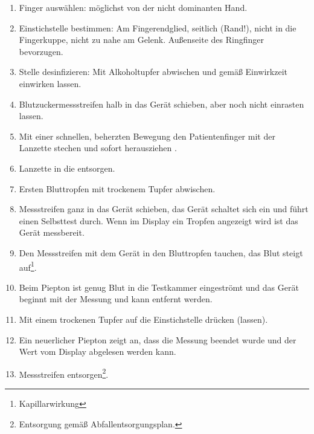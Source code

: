{
\begin{enumerate}
  \item Finger auswählen: möglichst von der nicht dominanten
  Hand.
  \item Einstichstelle bestimmen: Am Fingerendglied,
  seitlich (Rand!), nicht in die Fingerkuppe, nicht zu nahe
  am Gelenk. Außenseite des Ringfinger bevorzugen.
  \item Stelle desinfizieren: Mit Alkoholtupfer abwischen
  und gemäß Einwirkzeit einwirken lassen.
  \item Blutzuckermessstreifen halb in das Gerät schieben,
  aber noch nicht einrasten lassen.
  \item Mit einer schnellen, beherzten Bewegung den
  Patientenfinger mit der Lanzette stechen und sofort
  herausziehen .
  \item Lanzette in die  entsorgen.
  \item Ersten Bluttropfen mit trockenem Tupfer abwischen.
  \item Messstreifen ganz in das Gerät schieben, das Gerät
  schaltet sich ein und führt einen Selbsttest durch. Wenn
  im Display ein Tropfen angezeigt wird ist das Gerät
  messbereit.
  \item Den Messstreifen mit dem Gerät in den Bluttropfen
  tauchen, das Blut steigt auf\footnote{Kapillarwirkung}.
  \item Beim Piepton ist genug Blut in die Testkammer
  eingeströmt und das Gerät beginnt mit der Messung und kann
  entfernt werden. 
  \item Mit einem trockenen Tupfer auf die Einstichstelle
  drücken (lassen).
  \item Ein neuerlicher Piepton zeigt an, dass die Messung
  beendet wurde und der Wert vom Display abgelesen
  werden kann. 
  \item Messstreifen entsorgen\footnote{Entsorgung gemäß
  Abfallentsorgungsplan. }.
\end{enumerate}
}{

}



